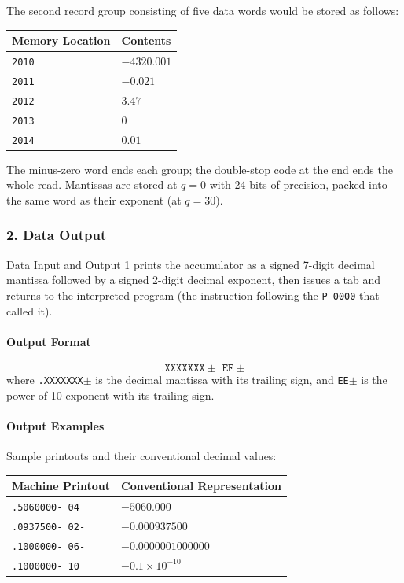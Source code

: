 \begin{enumerate}[label=\alph*)]
\medskip
The second record group consisting of five data words would be stored as follows:

\medskip
\begin{tabular}{ll}
\toprule
\textbf{Memory Location} & \textbf{Contents} \\
\midrule
\texttt{2010}        & $-4320.001$ \\
\texttt{2011}        & $-0.021$ \\
\texttt{2012}        & $3.47$ \\
\texttt{2013}        & $0$ \\
\texttt{2014}        & $0.01$ \\
\bottomrule
\end{tabular}

\medskip
The minus-zero word ends each group; the double-stop code at the end ends the whole read. Mantissas are stored at $q=0$ with 24 bits of precision, packed into the same word as their exponent (at $q=30$).
\end{enumerate}

\subsubsection*{2. Data Output}
Data Input and Output 1 prints the accumulator as a signed 7-digit decimal mantissa followed by a signed 2-digit decimal exponent, then issues a tab and returns to the interpreted program (the instruction following the \texttt{P 0000} that called it).

\paragraph{Output Format}
\[ \texttt{.XXXXXXX$\pm$\ EE$\pm$} \]
where \texttt{.XXXXXXX$\pm$} is the decimal mantissa with its trailing sign, and \texttt{EE$\pm$} is the power-of-10 exponent with its trailing sign.

\paragraph{Output Examples}
Sample printouts and their conventional decimal values:

\medskip
\begin{tabular}{ll}
\toprule
\textbf{Machine Printout} & \textbf{Conventional Representation} \\
\midrule
\texttt{.5060000-\ 04\ }  & $-5060.000$ \\
\texttt{.0937500-\ 02-}  & $-0.000937500$ \\
\texttt{.1000000-\ 06-}  & $-0.0000001000000$ \\
\texttt{.1000000-\ 10\ }  & $-0.1 \times 10^{-10}$ \\
\bottomrule
\end{tabular}

